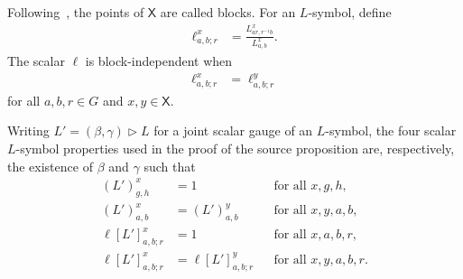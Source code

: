 \begin{definition}
    \label{def:mpug_block_independence_factor}
    \leanok
    Following~\cite{FrancoRubio2025MPUGauging}, the points of $\mathsf X$
    are called blocks. For an $L$-symbol, define
    \begin{align}
        \ell^x_{a,b;r}
         & =\frac{L^x_{ar,r^{-1}b}}{L^x_{a,b}}.
        \label{eq:mpug_block_scalar}
    \end{align}
    The scalar $\ell$ is block-independent when
    \begin{align}
        \ell^x_{a,b;r}
         & =\ell^y_{a,b;r}
        \label{eq:mpug_block_independence}
    \end{align}
    for all $a,b,r\in G$ and $x,y\in\mathsf X$.
\end{definition}

\begin{definition}
    \label{def:mpug_block_independence_gauge_forms}
    \leanok
    Writing $L'=(\beta,\gamma)\mathbin{\triangleright}L$ for a joint scalar
    gauge of an $L$-symbol, the four scalar $L$-symbol properties used in the
    proof of the source proposition are, respectively, the existence of $\beta$
    and $\gamma$ such that
    \begin{align}
        (L')^x_{g,h}       & =1
                           &                     & \text{for all $x,g,h$},
        \label{eq:mpug_block_form_trivial}                                     \\
        (L')^x_{a,b}       & =(L')^y_{a,b}
                           &                     & \text{for all $x,y,a,b$},
        \label{eq:mpug_block_form_constant}                                    \\
        \ell[L']^x_{a,b;r} & =1
                           &                     & \text{for all $x,a,b,r$},
        \label{eq:mpug_block_form_trivial_ell}                                 \\
        \ell[L']^x_{a,b;r} & =\ell[L']^y_{a,b;r}
                           &                     & \text{for all $x,y,a,b,r$}.
        \label{eq:mpug_block_form_independent_ell}
    \end{align}
\end{definition}

